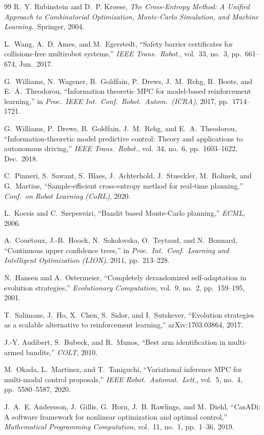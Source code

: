 \documentclass[11pt,onecolumn,a4paper]{article}
\begin{document}
\begin{thebibliography}{99}
R.~Y. Rubinstein and D.~P. Kroese, \emph{The Cross-Entropy Method: A
Unified Approach to Combinatorial Optimization, Monte-Carlo
Simulation, and Machine Learning.}\ Springer, 2004.

L.~Wang, A.~D. Ames, and M.~Egerstedt, ``Safety barrier certificates
for collisions-free multirobot systems,'' \emph{IEEE Trans.\ Robot.},
vol.~33, no.~3, pp.~661--674, Jun.\ 2017.

G.~Williams, N.~Wagener, B.~Goldfain, P.~Drews, J.~M.~Rehg,
B.~Boots, and E.~A.~Theodorou, ``Information theoretic MPC for
model-based reinforcement learning,'' in \emph{Proc.\ IEEE Int.\ Conf.\
Robot.\ Autom.\ (ICRA)}, 2017, pp.~1714--1721.

G.~Williams, P.~Drews, B.~Goldfain, J.~M.~Rehg, and
E.~A.~Theodorou, ``Information-theoretic model predictive control:
Theory and applications to autonomous driving,'' \emph{IEEE Trans.\
Robot.}, vol.~34, no.~6, pp.~1603--1622, Dec.\ 2018.

C.~Pinneri, S.~Sawant, S.~Blaes, J.~Achterhold, J.~Stueckler,
M.~Rolinek, and G.~Martius, ``Sample-efficient cross-entropy method
for real-time planning,'' \emph{Conf.\ on Robot Learning (CoRL)},
2020.

L.~Kocsis and C.~Szepesv\'ari, ``Bandit based Monte-Carlo planning,''
\emph{ECML}, 2006.

A.~Couëtoux, J.-B.~Hoock, N.~Sokolovska, O.~Teytaud, and N.~Bonnard,
``Continuous upper confidence trees,'' in \emph{Proc.\ Int.\ Conf.\
Learning and Intelligent Optimization (LION)}, 2011, pp.~213--228.

\bibitem{HAN01}
N.~Hansen and A.~Ostermeier, ``Completely derandomized self-adaptation
in evolution strategies,'' \emph{Evolutionary Computation}, vol.~9,
no.~2, pp.~159--195, 2001.

\bibitem{SAL17}
T.~Salimans, J.~Ho, X.~Chen, S.~Sidor, and I.~Sutskever, ``Evolution
strategies as a scalable alternative to reinforcement learning,''
arXiv:1703.03864, 2017.

\bibitem{AUD10}
J.-Y. Audibert, S.~Bubeck, and R.~Munos, ``Best arm identification in
multi-armed bandits,'' \emph{COLT}, 2010.

\bibitem{OKA20}
M.~Okada, L.~Martinez, and T.~Taniguchi, ``Variational inference MPC
for multi-modal control proposals,'' \emph{IEEE Robot.\ Automat.\
Lett.}, vol.~5, no.~4, pp.~5580--5587, 2020.

\bibitem{AND19}
J.~A.~E. Andersson, J.~Gillis, G.~Horn, J.~B. Rawlings, and M.~Diehl,
``CasADi: A software framework for nonlinear optimization and
optimal control,'' \emph{Mathematical Programming Computation},
vol.~11, no.~1, pp.~1--36, 2019.


\end{thebibliography}
\end{document}

